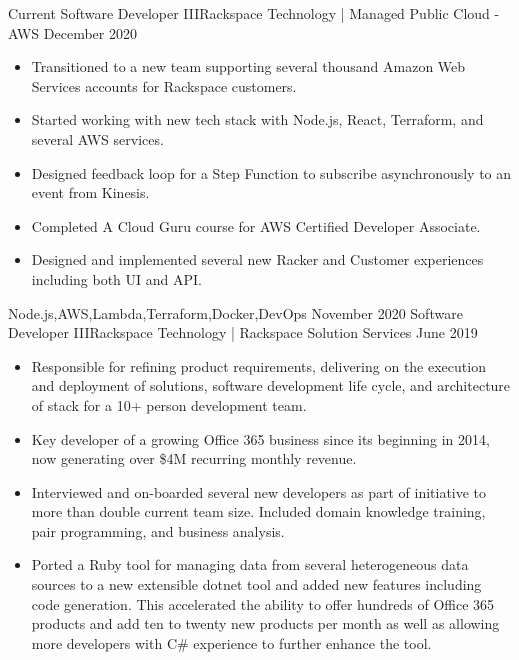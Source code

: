 \begin{experiences}
  \experience
    {Current}       {Software Developer III}{Rackspace Technology | Managed Public Cloud - AWS}
    {December 2020} {
                      \begin{itemize}
                        \item Transitioned to a new team supporting several thousand Amazon Web Services accounts for Rackspace customers.
                        \item Started working with new tech stack with Node.js, React, Terraform, and several AWS services.
                        \item Designed feedback loop for a Step Function to subscribe asynchronously to an event from Kinesis.
                        \item Completed A Cloud Guru course for AWS Certified Developer Associate.
                        \item Designed and implemented several new Racker and Customer experiences including both UI and API.
                      \end{itemize}
                    }
                    {Node.js,AWS,Lambda,Terraform,Docker,DevOps}
  \emptySeparator
  \experience
    {November 2020} {Software Developer III}{Rackspace Technology | Rackspace Solution Services}
    {June 2019}     {
                      \begin{itemize}
                        \item Responsible for refining product requirements, delivering on the execution and deployment of solutions, software development life cycle, and architecture of stack for a 10+ person development team.
                        \item Key developer of a growing Office 365 business since its beginning in 2014, now generating over \$4M recurring monthly revenue.
                        \item Interviewed and on-boarded several new developers as part of initiative to more than double current team size. Included domain knowledge training, pair programming, and business analysis.
                        \item Ported a Ruby tool for managing data from several heterogeneous data sources to a new extensible dotnet tool and added new features including code generation. This accelerated the ability to offer hundreds of Office 365 products and add ten to twenty new products per month as well as allowing more developers with C\# experience to further enhance the tool.

\end{itemize}}
\end{experiences}
